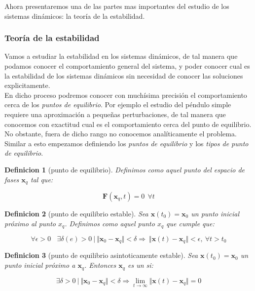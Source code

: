 \documentclass[12pt,a4paper]{article}
\numberwithin{equation}{section}
\numberwithin{figure}{section}
\newcommand{\xn}{\mathbf{x}}
\newcommand{\Fn}{\mathbf{F}}
\newtheorem{definition}{Definicion}[section]
\begin{document}
Ahora presentaremos una de las partes mas importantes del estudio de los sistemas dinámicos: la teoría de la estabilidad.

\subsubsection{Teoría de la estabilidad}

Vamos a estudiar la estabilidad en los sistemas dinámicos, de tal manera que podamos conocer el comportamiento general del sistema, y poder conocer cual es la estabilidad de los sistemas dinámicos sin necesidad de conocer las soluciones explicitamente.  \\

En dicho proceso podremos conocer con muchísima precisión el comportamiento cerca de los \textit{puntos de equilibrio}. Por ejemplo el estudio del péndulo simple requiere una aproximación a pequeñas perturbaciones, de tal manera que conocemos con exactitud cual es el comportamiento cerca del punto de equilibrio. No obstante, fuera de dicho rango no conocemos analíticamente el problema. Similar a esto empezamos definiendo los \textit{puntos de equilibrio} y los \textit{tipos de punto de equilibrio}.


\begin{definition}[punto de equilibrio]
Definimos  como aquel punto del espacio de fases $\xn_q$ tal que:

\begin{equation}
\Fn (\xn_q,t)= 0  \ \ \forall t
\end{equation}
\end{definition}

\begin{definition}[punto de equilibrio estable]
Sea $\xn(t_0) = \xn_0$ un punto inicial próximo al punto $x_q$. Definimos  como aquel punto $x_q$ que cumple que:

\begin{equation}
\forall \epsilon > 0 \ \ \ \ \exists \delta (e) > 0 \ | \  \Vert \xn_0 - \xn_q \Vert < \delta \Longrightarrow \ \Vert \xn (t) - \xn_q \Vert < \epsilon, \ \forall t >  t_0
\end{equation}
\end{definition}

\begin{definition}[punto de equilibrio asintoticamente estable]
Sea $\xn (t_0) = \xn_0$ un punto inicial próximo a $\xn_q$. Entonces $\xn_q$ es un  si:

\begin{equation}
\exists \delta > 0 \ | \ \Vert \xn_0 - \xn_q \Vert
 < \delta \Longrightarrow \lim_{t \rightarrow \infty} \Vert \xn (t) - \xn_q \Vert = 0
\end{equation}
\end{definition}
\end{document}
